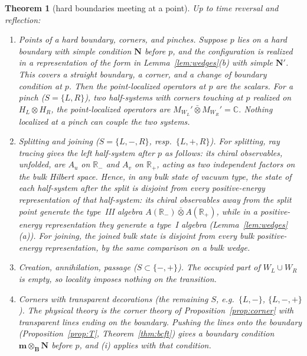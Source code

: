 \documentclass[11pt]{article}
\newtheorem{theorem}{Theorem}[section]
\theoremstyle{definition}
\theoremstyle{remark}
\newcommand{\bfB}{\mathbf B}
\begin{document}
\begin{theorem}[hard boundaries meeting at a point]\label{thm:hardmeet}
Up to time reversal and reflection:
\begin{enumerate}[nosep,label=(\roman*)]
\item \emph{Points of a hard boundary, corners, and pinches.} Suppose $p$ lies on a hard boundary with simple condition $\mathbf N$ before $p$, and the configuration is realized in a representation of the form in Lemma~\ref{lem:wedges}(b) with simple $\mathbf N'$. This covers a straight boundary, a corner, and a change of boundary condition at $p$. Then the point-localized operators at $p$ are the scalars. For a \emph{pinch} ($S=\{L,R\}$), two half-systems with corners touching at $p$ realized on $H_L\otimes H_R$, the point-localized operators are $M_{W_L}'\bar\otimes M_{W_R}'=\mathbb C$. Nothing localized at a pinch can couple the two systems.
\item \emph{Splitting and joining} ($S=\{L,-,R\}$, resp.\ $\{L,+,R\}$). For splitting, ray tracing gives the left half-system after $p$ as follows: its chiral observables, unfolded, are $A_u$ on $\mathbb R_-$ and $A_v$ on $\mathbb R_+$, acting as two independent factors on the bulk Hilbert space. Hence, in any bulk state of vacuum type, the state of each half-system after the split is \emph{disjoint} from every positive-energy representation of that half-system: its chiral observables away from the split point generate the type~III algebra $A(\mathbb R_-)\bar\otimes A(\mathbb R_+)$, while in a positive-energy representation they generate a type~I algebra (Lemma~\ref{lem:wedges}(a)). For joining, the joined bulk state is disjoint from every bulk positive-energy representation, by the same comparison on a bulk wedge.
\item \emph{Creation, annihilation, passage} ($S\subset\{-,+\}$). The occupied part of $W_L\cup W_R$ is empty, so locality imposes nothing on the transition.
\item \emph{Corners with transparent decorations} (the remaining $S$, e.g.\ $\{L,-\}$, $\{L,-,+\}$). The physical theory is the corner theory of Proposition~\ref{prop:corner} with transparent lines ending on the boundary. Pushing the lines onto the boundary (Proposition~\ref{prop:T}, Theorem~\ref{thm:bcft}) gives a boundary condition $\mathbf m\otimes_{\bfB}\mathbf N$ before $p$, and (i) applies with that condition.
\end{enumerate}
\end{theorem}
\end{document}
